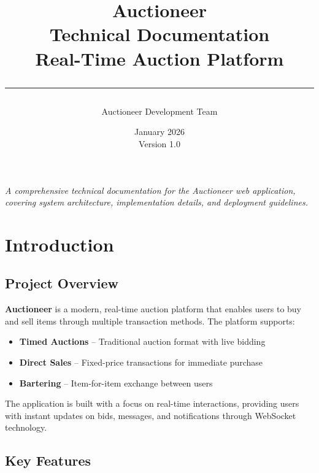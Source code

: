 \documentclass[12pt,a4paper]{report}
\title{
    \vspace{-2cm}
    {\Huge\textbf{\textcolor{primary}{Auctioneer}}}\\[0.5cm]
    {\Large Technical Documentation}\\[0.3cm]
    {\large Real-Time Auction Platform}\\[1cm]
    \rule{\textwidth}{0.4pt}
}
\author{Auctioneer Development Team}
\date{January 2026 \\ Version 1.0}
\begin{document}
\maketitle
\thispagestyle{empty}

\vfill
\begin{center}
\textit{A comprehensive technical documentation for the Auctioneer web application,\\
covering system architecture, implementation details, and deployment guidelines.}
\end{center}
\vfill

\newpage

\tableofcontents
\newpage

\chapter{Introduction}

\section{Project Overview}

\textbf{Auctioneer} is a modern, real-time auction platform that enables users to buy and sell items through multiple transaction methods. The platform supports:

\begin{itemize}
    \item \textbf{Timed Auctions} -- Traditional auction format with live bidding
    \item \textbf{Direct Sales} -- Fixed-price transactions for immediate purchase
    \item \textbf{Bartering} -- Item-for-item exchange between users
\end{itemize}

The application is built with a focus on real-time interactions, providing users with instant updates on bids, messages, and notifications through WebSocket technology.

\section{Key Features}
\end{document}
